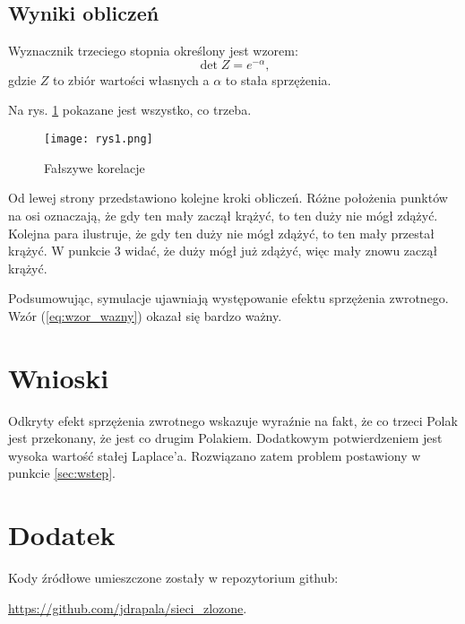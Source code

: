 \documentclass[10pt]{article}
\begin{document}
\subsection{Wyniki obliczeń} 
Wyznacznik trzeciego stopnia określony jest wzorem:
\begin{equation}
\det Z = e^{-\alpha},
\label{eq:wzor_wazny}
\end{equation}
gdzie $Z$ to zbiór wartości własnych a $\alpha$ to stała sprzężenia.

Na rys. \ref{fig:korelacje} pokazane jest wszystko, co trzeba. 
\begin{figure}[!hbt]
\begin{center}
\texttt{[image: rys1.png]}
\caption{Fałszywe korelacje}
\label{fig:korelacje}
\end{center}
\end{figure}
Od lewej strony przedstawiono kolejne kroki obliczeń. Różne położenia punktów na osi oznaczają, że gdy ten mały zaczął krążyć, to ten duży nie mógł zdążyć. Kolejna para ilustruje, że gdy ten duży nie mógł zdążyć, to ten mały przestał krążyć. W punkcie 3 widać, że duży mógł już zdążyć, więc mały znowu zaczął krążyć.

Podsumowując, symulacje ujawniają występowanie efektu sprzężenia zwrotnego. Wzór (\ref{eq:wzor_wazny}) okazał się bardzo ważny.

\section{Wnioski}
Odkryty efekt sprzężenia zwrotnego wskazuje wyraźnie na fakt, że co trzeci Polak jest przekonany, że jest co drugim Polakiem. Dodatkowym potwierdzeniem jest wysoka wartość stałej Laplace'a. Rozwiązano zatem problem postawiony w punkcie \ref{sec:wstep}.


\appendix
\section{Dodatek}
Kody źródłowe umieszczone zostały w repozytorium github:

\noindent \url{https://github.com/jdrapala/sieci_zlozone}.
\end{document}
